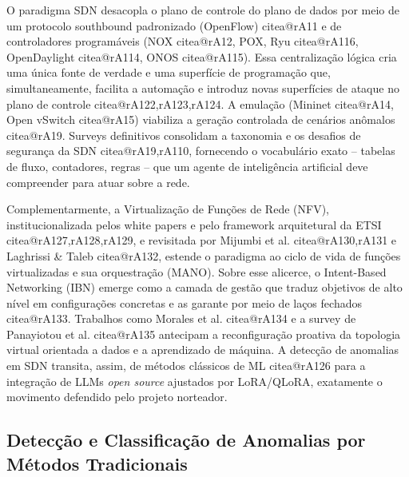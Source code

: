 \documentclass[12pt,a4paper]{article}
\makeatletter
\newcommand{\citea}[1]{\begingroup\edef\@currentlabel{\csname citea@#1\endcsname}\@currentlabel\endgroup}
\makeatother
\begin{document}
O paradigma SDN desacopla o plano de controle do plano de dados por meio de
um protocolo southbound padronizado (OpenFlow) \citea{rA11} e de
controladores programáveis (NOX \citea{rA12}, POX, Ryu \citea{rA116},
OpenDaylight \citea{rA114}, ONOS \citea{rA115}). Essa centralização lógica
cria uma única fonte de verdade e uma superfície de programação que,
simultaneamente, facilita a automação e introduz novas superfícies de ataque
no plano de controle \citea{rA122,rA123,rA124}. A emulação (Mininet
\citea{rA14}, Open vSwitch \citea{rA15}) viabiliza a geração controlada de
cenários anômalos \citea{rA19}. Surveys definitivos consolidam a taxonomia e
os desafios de segurança da SDN \citea{rA19,rA110}, fornecendo o vocabulário
exato -- tabelas de fluxo, contadores, regras -- que um agente de
inteligência artificial deve compreender para atuar sobre a rede.

Complementarmente, a Virtualização de Funções de Rede (NFV), institucionalizada
pelos white papers e pelo framework arquitetural da ETSI \citea{rA127,rA128,rA129},
e revisitada por Mijumbi et al. \citea{rA130,rA131} e Laghrissi \& Taleb
\citea{rA132}, estende o paradigma ao ciclo de vida de funções virtualizadas e
sua orquestração (MANO). Sobre esse alicerce, o Intent-Based Networking (IBN)
emerge como a camada de gestão que traduz objetivos de alto nível em
configurações concretas e as garante por meio de laços fechados
\citea{rA133}. Trabalhos como Morales et al. \citea{rA134} e a survey de
Panayiotou et al. \citea{rA135} antecipam a reconfiguração proativa da
topologia virtual orientada a dados e a aprendizado de máquina. A detecção
de anomalias em SDN transita, assim, de métodos clássicos de ML
\citea{rA126} para a integração de LLMs \textit{open source} ajustados por
LoRA/QLoRA, exatamente o movimento defendido pelo projeto norteador.

\subsection{Detecção e Classificação de Anomalias por Métodos Tradicionais}
\label{sec:ml}
\end{document}

